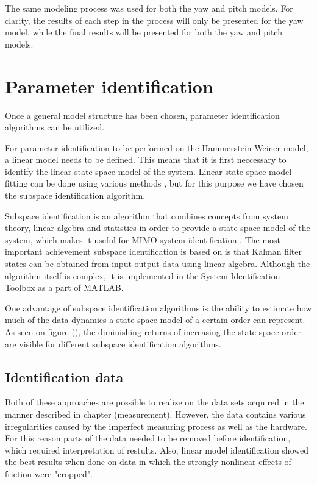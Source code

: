 The same modeling process was used for both the yaw and pitch models.
For clarity, the results of each step in the process will only be presented for the yaw model, while the final results will be presented for both the yaw and pitch models.

\section{Parameter identification}
Once a general model structure has been chosen, parameter identification algorithms can be utilized.

For parameter identification to be performed on the Hammerstein-Weiner model, a linear model needs to be defined.
This means that it is first neccessary to identify the linear state-space model of the system.
Linear state space model fitting can be done using various methods , but for this purpose we have chosen the subspace identification algorithm.

Subspace identification is an algorithm that combines concepts from system theory, linear algebra and statistics in order to provide a state-space model of the system, which makes it useful for MIMO system identification \cite{van2012subspace}. 
The most important achievement subspace identification is based on is that Kalman filter states can be obtained from input-output data using linear algebra.
Although the algorithm itself is complex, it is implemented in the System Identification Toolbox as a part of MATLAB.

One advantage of subspace identification algorithms is the ability to estimate how much of the data dynamics a state-space model of a certain order can represent. 
As seen on figure (), the diminishing returns of increasing the state-space order are visible for different subspace identification algorithms.


\subsection{Identification data}
Both of these approaches are possible to realize on the data sets acquired in the manner described in chapter (measurement).
However, the data contains various irregularities caused by the imperfect measuring process as well as the hardware.
For this reason parts of the data needed to be removed before identification, which required interpretation of restults.
Also, linear model identification showed the best results when done on data in which the strongly nonlinear effects of friction were "cropped".

